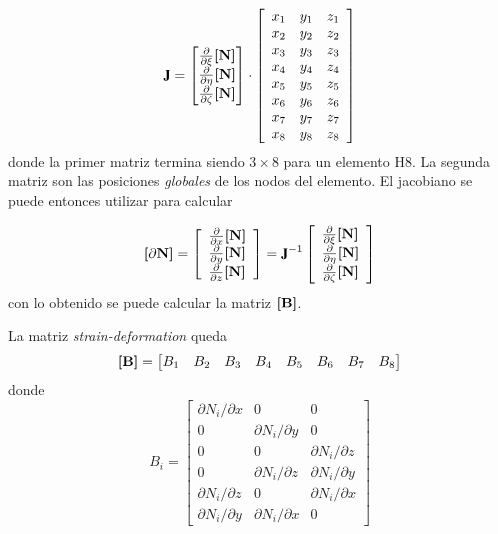 \begin{equation}
\jac = \begin{bmatrix}
\frac{\partial}{\partial \xi} \MN \\
\frac{\partial}{\partial \eta} \MN \\
\frac{\partial}{\partial \zeta} \MN 
\end{bmatrix}
\cdot 
\left[\begin{array}{lll}{x_{1}} & {y_{1}} & {z_{1}} \\ {x_{2}} & {y_{2}} & {z_{2}} \\ {x_{3}} & {y_{3}} & {z_{3}} \\ {x_{4}} & {y_{4}} & {z_{4}} \\ {x_{5}} & {y_{5}} & {z_{5}} \\ {x_{6}} & {y_{6}} & {z_{6}} \\ {x_{7}} & {y_{7}} & {z_{7}} \\ {x_{8}} & {y_{8}} & {z_{8}}\end{array}\right]
\end{equation}
donde la primer matriz termina siendo $3\times8$ para un elemento H8. La segunda matriz son las posiciones \textit{globales} de los nodos del elemento. El jacobiano se puede entonces utilizar para calcular

\begin{equation}
\Mme{\partial N}=\left[\begin{array}{l} \frac{\partial}{\partial x}\MN  \\ \frac{\partial}{\partial y} \MN  \\ \frac{\partial}{\partial z} \MN  \end{array}\right]=\jac^{-1}\left[\begin{array}{l}\frac{\partial}{\partial \xi} \MN \\
\frac{\partial}{\partial \eta} \MN \\ 
\frac{\partial}{\partial \zeta} \MN \end{array}\right]
\end{equation}
con lo obtenido se puede calcular la matriz $\boldsymbol{[}\mathbf{B} \boldsymbol{]}$.

La matriz \textit{strain-deformation} queda
\[
\boldsymbol{[}\mathbf{B} \boldsymbol{]} = \begin{bmatrix}
B_1 &B_2 &B_3 &B_4 &B_5 &B_6 &B_7 &B_8
\end{bmatrix}
\]
donde
\begin{equation}
B_{i}=\left[\begin{array}{ccc}{\partial N_{i} / \partial x} & {0} & {0} \\ {0} & {\partial N_{i} / \partial y} & {0} \\ {0} & {0} & {\partial N_{i} / \partial z} \\ {0} & {\partial N_{i} / \partial z} & {\partial N_{i} / \partial y} \\ {\partial N_{i} / \partial z} & {0} & {\partial N_{i} / \partial x} \\ {\partial N_{i} / \partial y} & {\partial N_{i} / \partial x} & {0}\end{array}\right]
\end{equation}

